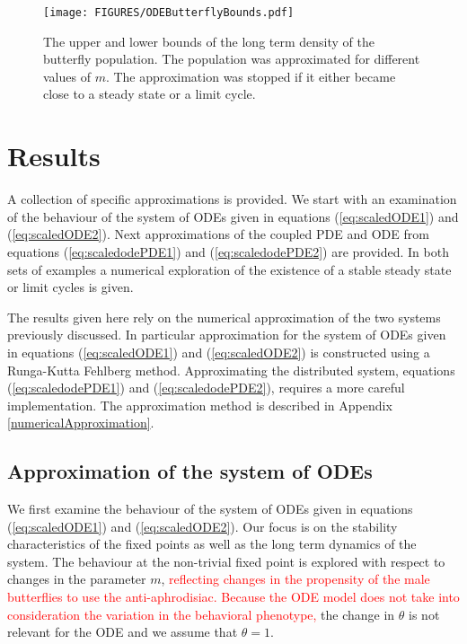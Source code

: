 \documentclass[review,authoryear]{elsarticle}
\begin{document}
\begin{figure}[htb]
  \centering
  \texttt{[image: FIGURES/ODEButterflyBounds.pdf]}
  \caption[Upper and lower bounds of the butterfly density.]{The upper
    and lower bounds of the long term density of the butterfly
    population. The population was approximated for different values
    of $m$. The approximation was stopped if it either became close to
    a steady state or a limit cycle.}
  \label{fig:odeButterflyBifurcation}
\end{figure}




\section{Results}
\label{section:results}

A collection of specific approximations is provided. We start with an
examination of the behaviour of the system of ODEs given in equations
(\ref{eq:scaledODE1}) and (\ref{eq:scaledODE2}). Next approximations
of the coupled PDE and ODE from equations (\ref{eq:scaledodePDE1}) and
(\ref{eq:scaledodePDE2}) are provided. In both sets of examples a
numerical exploration of the existence of a stable steady state or
limit cycles is given.

The results given here rely on the numerical approximation of the two
systems previously discussed. In particular approximation for the
system of ODEs given in equations (\ref{eq:scaledODE1}) and
(\ref{eq:scaledODE2}) is constructed using a Runga-Kutta Fehlberg
method. Approximating the distributed system, equations
(\ref{eq:scaledodePDE1}) and (\ref{eq:scaledodePDE2}), requires a more
careful implementation. The approximation method is described in
Appendix \ref{numericalApproximation}.

\subsection{Approximation of the system of ODEs}
\label{subsection:odeApproximation}

We first examine the behaviour of the system of ODEs given in
equations (\ref{eq:scaledODE1}) and (\ref{eq:scaledODE2}). Our focus
is on the stability characteristics of the fixed points as well as the
long term dynamics of the system. The behaviour at the non-trivial
fixed point is explored with respect to changes in the parameter
$m$, \textcolor{red}{reflecting changes in the propensity of the male butterflies to use the anti-aphrodisiac. }\textcolor{red}{Because the ODE model does not take into consideration the variation in the behavioral phenotype,} the change in $\theta$ is not relevant for the ODE and we 
assume that $\theta=1$.
\end{document}
